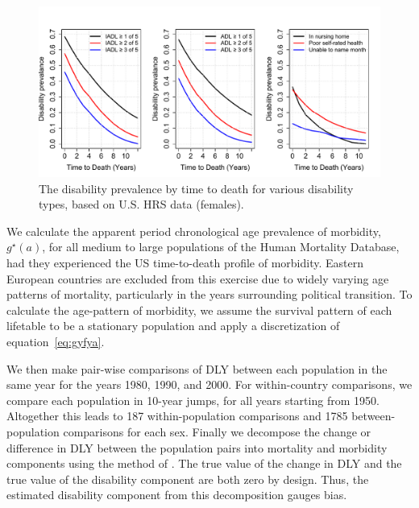 \documentclass[11pt,oneside,a4paper]{article} %
\begin{document}
\begin{figure}
\begin{adjustwidth}{-1.5cm}{}
	\centering
	\includegraphics[scale=.6]{Figures/DisbyTTD.pdf}
	\caption{The disability prevalence by time to death for various disability types, based on U.S. HRS data (females).}
	\label{fig:DisbyTTD}
\end{adjustwidth}
\end{figure}


We calculate the apparent period chronological age prevalence of morbidity,
$g^\star(a)$, for all medium to large populations of the Human Mortality
Database, had they experienced the US time-to-death profile of morbidity. Eastern European countries are excluded from this exercise due to widely varying
age patterns of mortality, particularly in the years surrounding political
transition. To calculate the age-pattern of morbidity, we assume the survival
pattern of each lifetable to be a stationary population and apply a
discretization of equation~\eqref{eq:gyfya}. 

We then make pair-wise comparisons of DLY between each population in
the same year for the years 1980, 1990, and 2000.
For within-country comparisons, we compare each population in
10-year jumps, for all years starting from 1950. Altogether this leads to
187 within-population comparisons and 1785 between-population comparisons for
each sex. Finally we decompose the change or difference in DLY between the
population pairs into mortality and morbidity components using the method of
\citet{Andreev2002}. The true value of the change in DLY and the true value of the disability component
are both zero by design. Thus, the estimated disability component from this
decomposition gauges bias.
\end{document}
